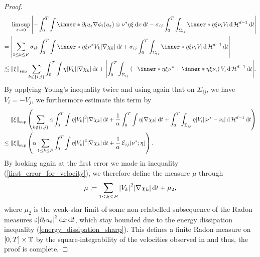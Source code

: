 \begin{proof}
\begin{align*}
		& \limsup_{ \varepsilon \to 0 }
		\abs{
			- \int_{ 0 }^{ T }
			\int
			\inner*{ \partial_{ t } u_{ 
					\varepsilon } }{ \nabla \phi_{ i } ( u_{ 
					\varepsilon } ) 
				\otimes \nu^{ \ast } \eta \xi }
			\dd{ x }
			\dd{ t }
			-
			\sigma_{ i j }
			\int_{ 0 }^{ T }
			\int_{ \Sigma_{ i j } }
			\inner*{ \eta \xi }{ \nu_{ i } }
			V_{ i } 	
			\dd{ \hm^{ d - 1 } }
			\dd{ t }
		}
		\\
		={} &
		\abs{
			\sum_{ 1 \leq k \leq P }
			\sigma_{ i k }
			\int_{ 0 }^{ T }
			\int
			\inner*{ \eta \xi }{ \nu^{ \ast } }
			V_{ k }
			\abs{ \nabla \chi_{ k } }
			\dd{ t }
			+
			\sigma_{ i j }
			\int_{ 0 }^{ T }
			\int_{ \Sigma_{ i j } }
			\inner*{ \eta \xi }{ \nu_{ i } }
			V_{ i }
			\dd{ \hm^{ d - 1 } }
			\dd{ t }
		}
		\\
		\lesssim{} &
		\norm{ \xi }_{ \mathrm{sup} }
		\sum_{ k \notin \{ i , j \} }
		\int_{ 0 }^{ T }
		\int
		\eta
		\abs{ V_{ k } }
		\abs{ \nabla \chi_{ k } }
		\dd{ t }
		+
		\abs{
			\int_{ 0 }^{ T }
			\int_{ \Sigma_{ i j } }
			\left(
			-\inner*{ \eta \xi }{ \nu^{ \ast } }
			+
			\inner*{ \eta \xi }{ \nu_{ i } }
			\right)
			V_{ i }
			\dd{ \hm^{ d -1 } }
			\dd{ t }
		}.
	\end{align*}
	By applying Young's inequality twice and using again that on $ \Sigma_{ i j 
	} 
	$, we have $ V_{ 
		i } = - V_{ j } $, we furthermore estimate this term by
	\begin{align*}
		& \norm{ \xi }_{ \mathrm{sup} }
		\left(
		\sum_{ k \notin \{ i , j \} }
		\alpha 
		\int_{ 0 }^{ T }
		\int
		\eta
		\abs{ V_{ k } }^{ 2 }
		\abs{ \nabla \chi_{ k } }
		\dd{ t }
		+
		\frac{ 1 }{ \alpha }
		\int_{ 0 }^{ T }
		\int
		\eta
		\abs{ \nabla \chi_{ k } }
		\dd{ t }
		+
		\int_{ 0 }^{ T }
		\int_{ \Sigma_{ i j } }
		\eta
		\abs{ V_{ i } }
		\abs{ \nu^{ \ast } - \nu_{ i } }
		\dd{ \hm^{ d - 1 } }
		\dd{ t }
		\right)
		\\
		\leq{} &
		\norm{ \xi }_{\mathrm{sup} }
		\left(
		\alpha
		\sum_{ 1 \leq k \leq P }
		\int_{ 0 }^{ T }
		\int
		\eta
		\abs{ V_{ k } }^{ 2 }
		\abs{ \nabla \chi_{ k } }
		\dd{ t}
		+
		\frac{ 1 }{ \alpha }
		\tilt_excess_{ i j } ( \nu^{ \ast } ; \eta )
		\right).
	\end{align*}
	By looking again at the first error we made in inequality 
	(\ref{first_error_for_velocity}), we therefore define the measure $ \mu $ 
	through
	\begin{equation*}
		\mu
		\coloneqq
		\sum_{ 1 \leq k \leq P }
		\abs{ V_{ k } }^{ 2 }
		\abs{ \nabla \chi_{ k } }
		\dd{ t }
		+
		\mu_{ 2 },
	\end{equation*}
	where $ \mu_{ 2 } $ is the weak-star limit of some non-relabelled 
	subsequence of the Radon measures $ \varepsilon \abs{ \partial_{ t } u_{ 
			\varepsilon } }^{ 2 } \dd{ x } \dd{ t } $, which stay bounded due 
			to the 
	energy dissipation inequality (\ref{energy_dissipation_sharp}).
	This defines a finite Radon measure on $ [ 0 , T ] \times \operatorname{\mathbb{T}} $ by 
	the square-integrability of the velocities observed in 
	 and 
	thus, the proof is complete.
\end{proof}

